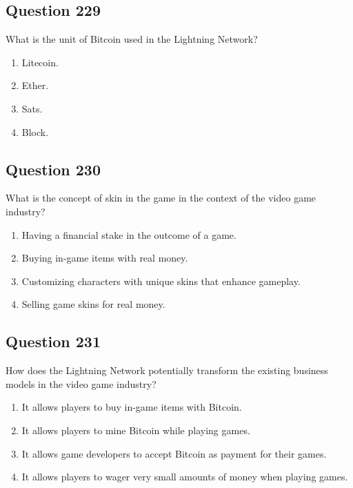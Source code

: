 \documentclass[12pt,a4paper]{article}
\begin{document}
\bigskip


\subsection*{Question 229}
What is the unit of Bitcoin used in the Lightning Network?

\begin{enumerate}[label=\Alph*., leftmargin=*]
\item Litecoin.
\item Ether.
\item Sats.
\item Block.
\end{enumerate}

\bigskip


\subsection*{Question 230}
What is the concept of skin in the game in the context of the video game industry?

\begin{enumerate}[label=\Alph*., leftmargin=*]
\item Having a financial stake in the outcome of a game.
\item Buying in-game items with real money.
\item Customizing characters with unique skins that enhance gameplay.
\item Selling game skins for real money.
\end{enumerate}

\bigskip


\subsection*{Question 231}
How does the Lightning Network potentially transform the existing business models in the video game industry?

\begin{enumerate}[label=\Alph*., leftmargin=*]
\item It allows players to buy in-game items with Bitcoin.
\item It allows players to mine Bitcoin while playing games.
\item It allows game developers to accept Bitcoin as payment for their games.
\item It allows players to wager very small amounts of money when playing games.
\end{enumerate}
\end{document}
